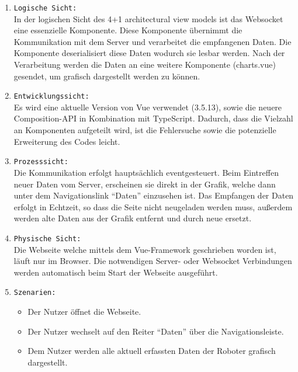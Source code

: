 \begin{enumerate}
  \item \texttt{Logische Sicht:} \\
  In der logischen Sicht des 4+1 architectural view models ist das Websocket eine essenzielle Komponente.
  Diese Komponente übernimmt die Kommunikation mit dem Server und verarbeitet die empfangenen Daten.
  Die Komponente deserialisiert diese Daten wodurch sie lesbar werden. Nach der Verarbeitung werden die Daten an 
  eine weitere Komponente (charts.vue) gesendet, um grafisch dargestellt werden zu können.
  \item \texttt{Entwicklungssicht:} \\
  Es wird eine aktuelle Version von Vue verwendet (3.5.13), sowie die neuere Composition-API in Kombination mit TypeScript.
  Dadurch, dass die Vielzahl an Komponenten aufgeteilt wird,
  ist die Fehlersuche sowie die potenzielle Erweiterung des Codes leicht.
  \item \texttt{Prozesssicht:} \\
  Die Kommunikation erfolgt hauptsächlich eventgesteuert. 
  Beim Eintreffen neuer Daten vom Server, erscheinen sie direkt in der Grafik, 
  welche dann unter dem Navigationslink ``Daten'' einzusehen ist.
  Das Empfangen der Daten erfolgt in Echtzeit, so dass die Seite nicht neugeladen werden muss, 
  außerdem werden alte Daten aus der Grafik entfernt und durch neue ersetzt.
  \item \texttt{Physische Sicht:} \\
  Die Webseite welche mittels dem Vue-Framework geschrieben worden ist, läuft nur im Browser.
  Die notwendigen Server- oder Websocket Verbindungen werden automatisch beim Start der Webseite ausgeführt.
  \item \texttt{Szenarien:} \\
    \begin{itemize}
      \renewcommand{\labelitemi}{$\Rightarrow$}
    \item Der Nutzer öffnet die Webseite.
    \item Der Nutzer wechselt auf den Reiter ``Daten'' über die Navigationsleiste.
    \item Dem Nutzer werden alle aktuell erfassten Daten der Roboter grafisch dargestellt.
    \end{itemize}
\end{enumerate}

